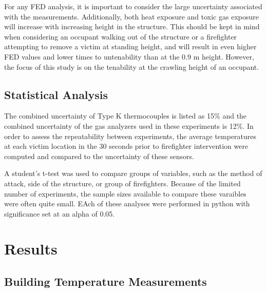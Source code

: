 \documentclass[12pt,oneside]{article}
\begin{document}
 For any FED analysis, it is important to consider the large uncertainty associated with the measurements. Additionally, both heat exposure and toxic gas exposure will increase with increasing height in the structure. This should be kept in mind when considering an occupant walking out of the structure or a firefighter attempting to remove a victim at standing height,  and will result in even higher FED values and lower times to untenability than at the 0.9 m height. However, the focus of this study is on the tenability at the crawling height of an occupant.


\subsection{Statistical Analysis}

The combined uncertainty of Type K thermocouples is listed as 15\% \cite{Blevins:1999,Pitts_etal_TC} and the combined uncertainty of the gas analyzers used in these experiments is 12\%. In order to assess the repeatability between experiments, the average temperatures at each victim location in the 30 seconds prior to firefighter intervention were computed and compared to the uncertainty of these sensors. 

A student's t-test was used to compare groups of variables, such as the method of attack, side of the structure, or group of firefighters. Because of the limited number of experiments, the sample sizes available to compare these varaibles were often quite small. EAch of these analyses were performed in python with significance set at an alpha of 0.05.

\section{Results}

\subsection{Building Temperature Measurements}
\label{subsec:temps}
\end{document}
